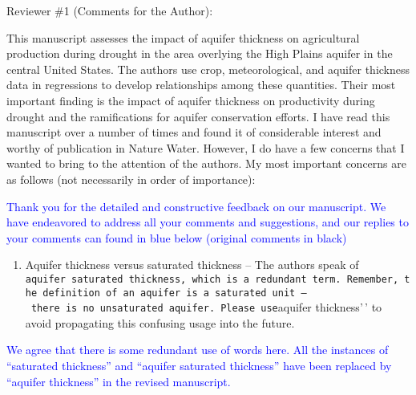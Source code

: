 \documentclass[
]{article}
\author{}
\date{\vspace{-2.5em}}
\providecommand{\tightlist}{%
  \setlength{\itemsep}{0pt}\setlength{\parskip}{0pt}}
\begin{document}
Reviewer \#1 (Comments for the Author):

This manuscript assesses the impact of aquifer thickness on agricultural
production during drought in the area overlying the High Plains aquifer
in the central United States. The authors use crop, meteorological, and
aquifer thickness data in regressions to develop relationships among
these quantities. Their most important finding is the impact of aquifer
thickness on productivity during drought and the ramifications for
aquifer conservation efforts. I have read this manuscript over a number
of times and found it of considerable interest and worthy of publication
in Nature Water. However, I do have a few concerns that I wanted to
bring to the attention of the authors. My most important concerns are as
follows (not necessarily in order of importance):

\textcolor{blue}{Thank you for the detailed and constructive feedback on our manuscript. We have endeavored to address all your comments and suggestions, and our replies to your comments can found in blue below (original comments in black)}

\begin{enumerate}
\def\labelenumi{\arabic{enumi}.}
\tightlist
\item
  Aquifer thickness versus saturated thickness -- The authors speak of
  \texttt{aquifer\ saturated\ thickness\textquotesingle{}\textquotesingle{},\ which\ is\ a\ redundant\ term.\ Remember,\ the\ definition\ of\ an\ aquifer\ is\ a\ saturated\ unit\ –\ there\ is\ no\ unsaturated\ aquifer.\ Please\ use}aquifer
  thickness'\,' to avoid propagating this confusing usage into the
  future.
\end{enumerate}

\textcolor{blue}{We agree that there is some redundant use of words here. All the instances of ``saturated thickness'' and ``aquifer saturated thickness'' have been replaced by ``aquifer thickness'' in the revised manuscript.}
\end{document}
